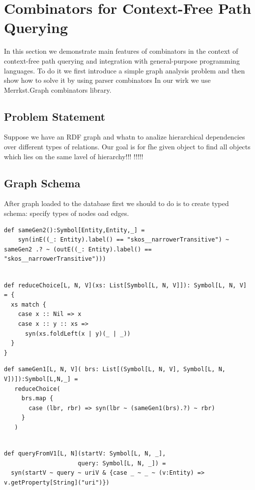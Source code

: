 \section{Combinators for Context-Free Path Querying}

In this section we demonstrate main features of combinators in the context of context-free path querying and integration with general-purpose programming languages.
To do it we first introduce a simple graph analysis problem and then show how to solve it by using parser combinators
In our wirk we use Merrkst.Graph combinators library.

\subsection{Problem Statement}
Suppose we have an RDF graph and whatn to analize hierarchical dependencies over different types of relations.
Our goal is for fhe given object to find all objects which lies on the same lavel of hierarchy!!!
!!!!!

\subsection{Graph Schema}
After graph loaded to the database first we should to do is to create typed schema: specify types of nodes oad edges.

\begin{lstlisting}
def sameGen2():Symbol[Entity,Entity,_] =
    syn(inE((_: Entity).label() == "skos__narrowerTransitive") ~ sameGen2 .? ~ (outE((_: Entity).label() == "skos__narrowerTransitive")))
\end{lstlisting}



\begin{lstlisting}

def reduceChoice[L, N, V](xs: List[Symbol[L, N, V]]): Symbol[L, N, V] = {
  xs match {
	case x :: Nil => x
	case x :: y :: xs =>
	  syn(xs.foldLeft(x | y)(_ | _))
  }
}
\end{lstlisting}


\begin{lstlisting}
def sameGen1[L, N, V]( brs: List[(Symbol[L, N, V], Symbol[L, N, V])]):Symbol[L,N,_] =
   reduceChoice(
	 brs.map {
	   case (lbr, rbr) => syn(lbr ~ (sameGen1(brs).?) ~ rbr)
	 }
   )
\end{lstlisting}

\begin{lstlisting}

def queryFromV1[L, N](startV: Symbol[L, N, _],
					 query: Symbol[L, N, _]) =
  syn(startV ~ query ~ uriV & {case _ ~ _ ~ (v:Entity) => v.getProperty[String]("uri")})
\end{lstlisting}

